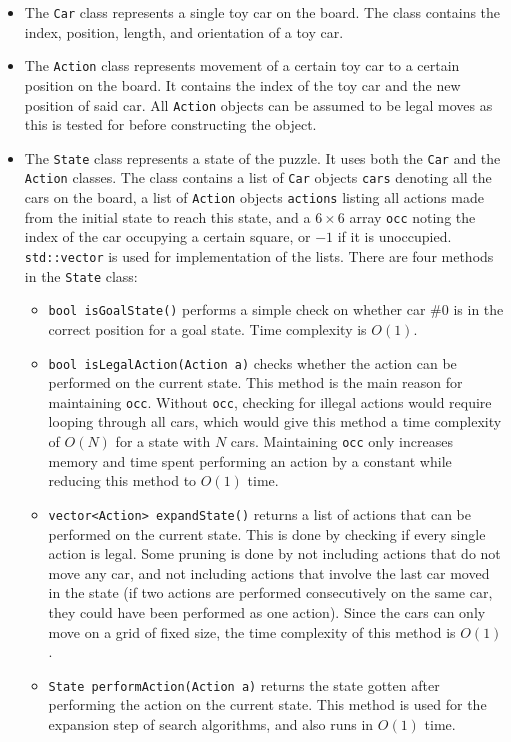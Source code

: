 \documentclass[12pt, a4paper]{article}
\begin{document}
\begin{itemize}

    \item The {\tt Car} class represents a single toy car on the board. The class contains the index, position, length, and orientation of a toy car.

    \item The {\tt Action} class represents movement of a certain toy car to a certain position on the board. It contains the index of the toy car and the new position of said car. All {\tt Action} objects can be assumed to be legal moves as this is tested for before constructing the object.

    \item The {\tt State} class represents a state of the puzzle. It uses both the {\tt Car} and the {\tt Action} classes. The class contains a list of {\tt Car} objects {\tt cars} denoting all the cars on the board, a list of {\tt Action} objects {\tt actions} listing all actions made from the initial state to reach this state, and a $6\times6$ array {\tt occ} noting the index of the car occupying a certain square, or $-1$ if it is unoccupied. {\tt std::vector} is used for implementation of the lists. There are four methods in the {\tt State} class:

    \begin{itemize}
    
        \item {\tt bool isGoalState()} performs a simple check on whether car \#0 is in the correct position for a goal state. Time complexity is $O(1)$.
    
        \item {\tt bool isLegalAction(Action a)} checks whether the action can be performed on the current state. This method is the main reason for maintaining {\tt occ}. Without {\tt occ}, checking for illegal actions would require looping through all cars, which would give this method a time complexity of $O(N)$ for a state with $N$ cars. Maintaining {\tt occ} only increases memory and time spent performing an action by a constant while reducing this method to $O(1)$ time.

        \item {\tt vector<Action> expandState()} returns a list of actions that can be performed on the current state. This is done by checking if every single action is legal. Some pruning is done by not including actions that do not move any car, and not including actions that involve the last car moved in the state (if two actions are performed consecutively on the same car, they could have been performed as one action). Since the cars can only move on a grid of fixed size, the time complexity of this method is $O(1)$.
    
        \item {\tt State performAction(Action a)} returns the state gotten after performing the action on the current state. This method is used for the expansion step of search algorithms, and also runs in $O(1)$ time.
    
    \end{itemize}

\end{itemize}
\end{document}

